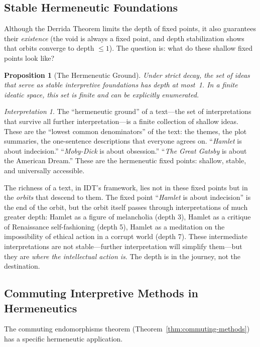 \documentclass[11pt,openany]{book}
\theoremstyle{definition}
\theoremstyle{plain}
\newtheorem{proposition}[axiom]{Proposition}
\theoremstyle{remark}
\newtheorem{interpretation}[axiom]{Interpretation}
\begin{document}
\subsection{Stable Hermeneutic Foundations}

Although the Derrida Theorem limits the depth of fixed points, it also guarantees their \emph{existence} (the void is always a fixed point, and depth stabilization shows that orbits converge to depth $\leq 1$). The question is: what do these shallow fixed points look like?

\begin{proposition}[The Hermeneutic Ground]
Under strict decay, the set of ideas that serve as stable interpretive foundations has depth at most~1. In a finite ideatic space, this set is finite and can be explicitly enumerated.
\end{proposition}

\begin{interpretation}
The ``hermeneutic ground'' of a text---the set of interpretations that survive all further interpretation---is a finite collection of shallow ideas. These are the ``lowest common denominators'' of the text: the themes, the plot summaries, the one-sentence descriptions that everyone agrees on. ``\textit{Hamlet} is about indecision.'' ``\textit{Moby-Dick} is about obsession.'' ``\textit{The Great Gatsby} is about the American Dream.'' These are the hermeneutic fixed points: shallow, stable, and universally accessible.

The richness of a text, in IDT's framework, lies not in these fixed points but in the \emph{orbits} that descend to them. The fixed point ``\textit{Hamlet} is about indecision'' is the end of the orbit, but the orbit itself passes through interpretations of much greater depth: Hamlet as a figure of melancholia (depth 3), Hamlet as a critique of Renaissance self-fashioning (depth 5), Hamlet as a meditation on the impossibility of ethical action in a corrupt world (depth 7). These intermediate interpretations are not stable---further interpretation will simplify them---but they are \emph{where the intellectual action is}. The depth is in the journey, not the destination.
\end{interpretation}

\subsection{Commuting Interpretive Methods in Hermeneutics}

The commuting endomorphisms theorem (Theorem~\ref{thm:commuting-methods}) has a specific hermeneutic application.
\end{document}
